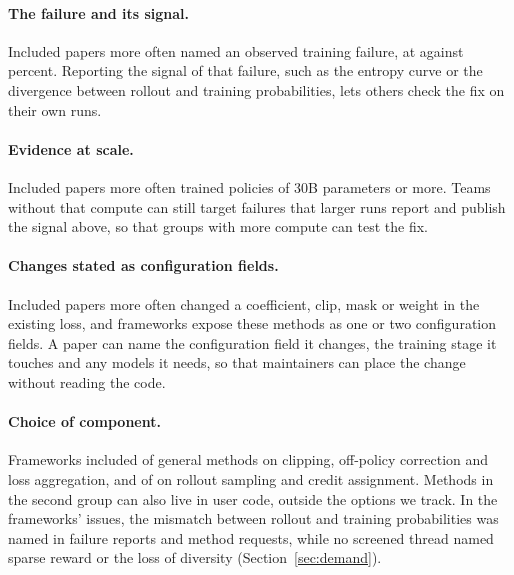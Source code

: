 \documentclass{article}
\begin{document}
\paragraph{The failure and its signal.} Included papers more often named an observed training failure, at \CCFailureCasePct{} against \CCFailureCtrlPct{} percent. Reporting the signal of that failure, such as the entropy curve or the divergence between rollout and training probabilities, lets others check the fix on their own runs.

\paragraph{Evidence at scale.} Included papers more often trained policies of 30B parameters or more. Teams without that compute can still target failures that larger runs report and publish the signal above, so that groups with more compute can test the fix.

\paragraph{Changes stated as configuration fields.} Included papers more often changed a coefficient, clip, mask or weight in the existing loss, and frameworks expose these methods as one or two configuration fields. A paper can name the configuration field it changes, the training stage it touches and any models it needs, so that maintainers can place the change without reading the code.

\paragraph{Choice of component.} Frameworks included \NCoreCompAdopted{} of \NCoreComp{} general methods on clipping, off-policy correction and loss aggregation, and \NCrowdCompAdopted{} of \NCrowdComp{} on rollout sampling and credit assignment. Methods in the second group can also live in user code, outside the options we track. In the frameworks' issues, the mismatch between rollout and training probabilities was named in \NIssueTrainInferMismatch{} failure reports and \NReqMismatch{} method requests, while no screened thread named sparse reward or the loss of diversity (Section~\ref{sec:demand}).
\end{document}
